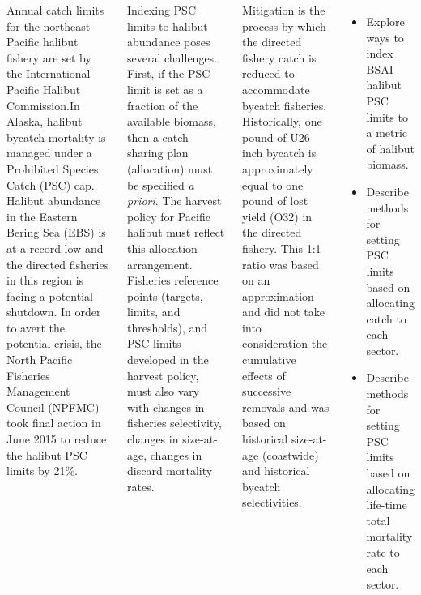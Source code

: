 \documentclass[20pt, a0paper, landscape]{tikzposter}
\begin{document}
\begin{columns}
	{
		Annual catch limits for the northeast Pacific halibut fishery are set by the International Pacific Halibut Commission.In Alaska, halibut bycatch mortality is managed under a Prohibited Species Catch (PSC) cap.  Halibut abundance in the Eastern Bering Sea (EBS) is at a record low and the directed fisheries in this region is facing a potential shutdown.  In order to avert the potential crisis, the North Pacific Fisheries Management Council (NPFMC) took final action in June 2015 to reduce the halibut PSC limits by 21\%. 

		Indexing PSC limits to halibut abundance poses several challenges.  First, if the PSC limit is set as a fraction of the available biomass, then a catch sharing plan (allocation) must be specified \emph{a priori}.  The harvest policy for Pacific halibut must reflect this allocation arrangement.  Fisheries reference points (targets, limits, and thresholds), and PSC limits developed in the harvest policy, must also vary with changes in fisheries selectivity, changes in size-at-age, changes in discard mortality rates.

		Mitigation is the process by which the directed fishery catch is reduced to accommodate bycatch fisheries.  Historically, one pound of U26 inch bycatch is approximately equal to one pound of lost yield (O32) in the directed fishery.  This 1:1 ratio was based on an approximation and did not take into consideration the cumulative effects of successive removals and was based on historical size-at-age (coastwide) and historical bycatch selectivities.
	}
	{
		
		\begin{itemize}
			\item Explore ways to index BSAI halibut PSC limits to a metric of halibut biomass.
			\item Describe methods for setting PSC limits based on allocating catch to each sector.
			\item Describe methods for setting PSC limits based on allocating life-time total mortality rate to each sector.
		\end{itemize}
		 
	}

 

\end{columns}
\end{document}
